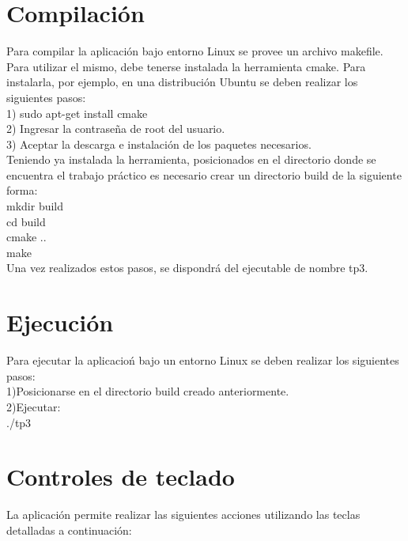 \documentclass[11pt]{article}
\begin{document}
\section{Compilaci\'on}
  Para compilar la aplicaci\'on bajo entorno Linux se provee un archivo makefile.
  Para utilizar el mismo, debe tenerse instalada la herramienta cmake. Para instalarla, por ejemplo, en una distribuci\'on Ubuntu se deben 
realizar los siguientes pasos: \\
1) sudo apt-get install cmake \\
2) Ingresar la contrase\~na de root del usuario. \\
3) Aceptar la descarga e instalaci\'on de los paquetes necesarios. \\ 

Teniendo ya instalada la herramienta, posicionados en el directorio donde se encuentra el trabajo pr\'actico es necesario crear un directorio build
de la siguiente forma: \\
mkdir build \\
cd build \\
cmake .. \\
make \\

Una vez realizados estos pasos, se dispondr\'a del ejecutable de nombre tp3.

\section{Ejecuci\'on}

Para ejecutar la aplicacio\'n bajo un entorno Linux se deben realizar los siguientes pasos: \\
1)Posicionarse en el directorio build creado anteriormente. \\
2)Ejecutar: \\
./tp3 

\newpage
\section{Controles de teclado}

La aplicaci\'on permite realizar las siguientes acciones utilizando las teclas detalladas a continuaci\'on: \\
\end{document}
